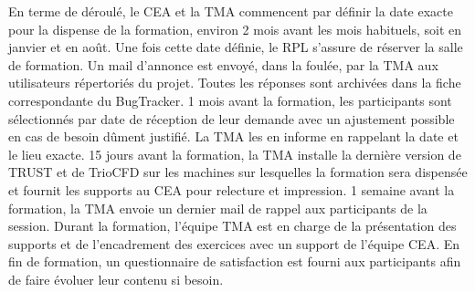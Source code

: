 En terme de déroulé, le CEA et la TMA commencent par définir la date exacte pour la dispense de la formation, environ 2 mois avant les mois habituels, soit en janvier et en août. Une fois cette date définie, le RPL s'assure de réserver la salle de formation. Un mail d'annonce est  envoyé, dans la foulée, par la TMA aux utilisateurs répertoriés du projet. Toutes les réponses sont archivées dans la fiche correspondante du BugTracker. 1 mois avant la formation, les participants sont sélectionnés par date de réception de leur demande avec un ajustement possible en cas de besoin dûment justifié. La TMA les en informe en rappelant la date et le lieu exacte. 15 jours avant la formation, la TMA installe la dernière version de TRUST et de TrioCFD sur les machines sur lesquelles la formation sera dispensée et fournit les supports au CEA pour relecture et impression. 1 semaine avant la formation, la TMA envoie un dernier mail de rappel aux participants de la session. Durant la formation, l'équipe TMA est en charge de la présentation des supports et de l'encadrement des exercices avec un support de l'équipe CEA. En fin de formation, un questionnaire de satisfaction est fourni aux participants afin de faire évoluer leur contenu si besoin.
